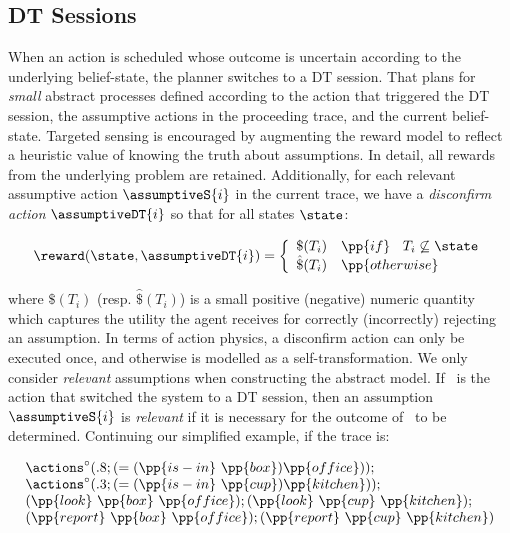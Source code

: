 \subsection{DT Sessions}

When an action is scheduled whose outcome is uncertain according to
the underlying belief-state, the planner switches to a DT
session. That plans for {\em small} abstract processes defined
according to the action that triggered the DT session, the assumptive
actions in the proceeding trace, and the current
belief-state. Targeted sensing is encouraged by augmenting the reward
model to reflect a heuristic value of knowing the truth about
assumptions. In detail, all rewards from the underlying problem are
retained. Additionally, for each relevant assumptive action
$\assumptiveS{i}$ in the current trace, we have a {\em disconfirm
action} $\assumptiveDT{i}$ so that for all states $\state$:

\vspace{-1ex}
\small
\[
\reward(\state, \assumptiveDT{i}) = \bigg\{ \begin{array}{ll}
\$(T_i) & \pp{if}~\;\;T_i \not\subseteq \state \\
\hat\$(T_i) & \pp{otherwise} \\
\end{array}
\]
\normalsize

\vspace{-1ex}

\noindent where $\$(T_i)$ (resp. $\hat\$(T_i)$) is a
small positive (negative) numeric quantity which captures
the utility the agent receives for correctly (incorrectly) rejecting
an assumption.
In terms of action physics, a disconfirm action can only be executed
once, and otherwise is modelled as a self-transformation.
We only consider {\em relevant} assumptions when constructing the
abstract model.  If \switchAction\ is the action that switched the
system to a DT session, then an assumption $\assumptiveS{i}$ is {\em
relevant} if it is necessary for the outcome of \switchAction\ to be
determined.  Continuing our simplified example, if the trace is:

\small
\[
\begin{array}{l}
\actions^{\circ}(.8;(=(\pp{is-in}~\pp{box})\pp{office}));\\
\actions^{\circ}(.3;(=(\pp{is-in}~\pp{cup})\pp{kitchen}));\\
(\pp{look}~\pp{box}~\pp{office});
(\pp{look}~\pp{cup}~\pp{kitchen});\\
(\pp{report}~\pp{box}~\pp{office}); 
(\pp{report}~\pp{cup}~\pp{kitchen})
\end{array}
\]
\normalsize

